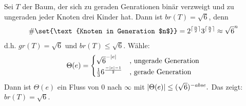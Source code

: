 \begin{beispiel}
	Sei $T$ der Baum, der sich zu geraden Genrationen binär verzweigt und zu ungeraden jeder Knoten drei Kinder hat. Dann ist $br(T) = \sqrt{6}$, denn
	\begin{align}
		\#\set{\text{Knoten in Generation $n$}} = 2^{\lceil\frac{n}{2} \rceil} 3^{\lceil\frac{n}{2} \rceil} \approx \sqrt{6}^n 
	\end{align}
	d.h. $gr(T) = \sqrt{6}$ und $br(T) \leq \sqrt{6}$.
	Wähle:
	\begin{align}
		\Theta(e) = 	
						\begin{cases}
							\sqrt{6}^{-\lvert e\rvert} &\text{, ungerade Generation} \\
							\frac{1}{3} 6^{\frac{- \lvert e\rvert -1}{2}} &\text{, gerade Generation}
						\end{cases}
	\end{align}
	Dann ist $\Theta(e)$ ein Fluss von $0$ nach $\infty$ mit $\lvert\Theta(e)\rvert \leq (\sqrt{6}) ^{-abs{e}}.$ Das zeigt: $br(T) = \sqrt{6}$.
\end{beispiel}













 